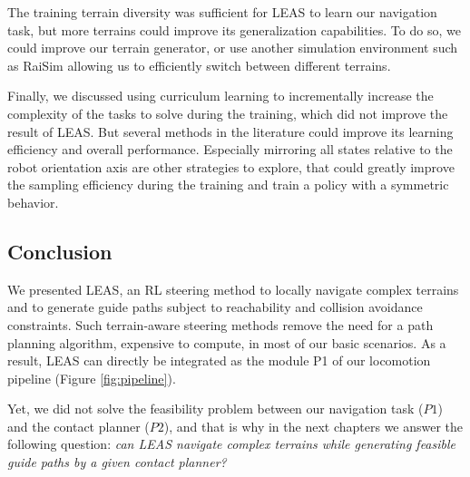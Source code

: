 The training terrain diversity was sufficient for LEAS to learn our navigation task, but more terrains could improve its generalization capabilities.
To do so, we could improve our terrain generator, or use another simulation environment such as RaiSim \cite{raisim} allowing us to efficiently switch between different terrains.

Finally, we discussed using curriculum learning \cite{curriculum_learning_survey} to incrementally increase the complexity of the tasks to solve during the training, which did not improve the result of LEAS. But several methods in the literature could improve its learning efficiency and overall performance.
Especially mirroring all states relative to the robot orientation axis are other strategies to explore, that could greatly improve the sampling efficiency during the training and train a policy with a symmetric behavior.


\subsection{Conclusion}
We presented LEAS, an RL steering method to locally navigate complex terrains and to generate guide paths subject to reachability and collision avoidance constraints. 
Such terrain-aware steering methods remove the need for a path planning algorithm, expensive to compute, in most of our basic scenarios.
As a result, LEAS can directly be integrated as the module P1 of our locomotion pipeline (Figure \ref{fig:pipeline}).

Yet, we did not solve the feasibility problem between our navigation task ($P1$) and the contact planner ($P2$), and that is why in the next chapters we answer the following question: 
\textit{can LEAS navigate complex terrains while generating feasible guide paths by a given contact planner?}